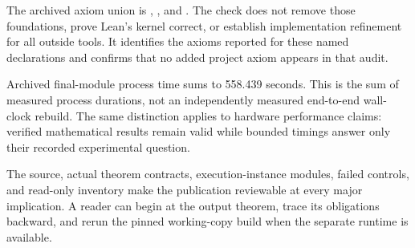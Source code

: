 \documentclass[11pt]{article}\usepackage{needspace}\renewcommand{\paperkind}{Lean companion}\setlength{\parskip}{0.35em}
\begin{document}
The archived axiom union is , , and . The check does not remove those foundations, prove Lean's kernel correct, or establish implementation refinement for all outside tools. It identifies the axioms reported for these named declarations and confirms that no added project axiom appears in that audit.

Archived final-module process time sums to 558.439 seconds. This is the sum of measured process durations, not an independently measured end-to-end wall-clock rebuild. The same distinction applies to hardware performance claims: verified mathematical results remain valid while bounded timings answer only their recorded experimental question.

The source, actual theorem contracts, execution-instance modules, failed controls, and read-only inventory make the publication reviewable at every major implication. A reader can begin at the output theorem, trace its obligations backward, and rerun the pinned working-copy build when the separate runtime is available.
\end{document}
